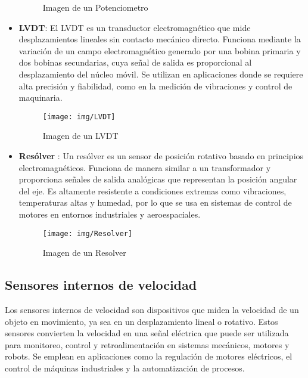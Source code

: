 \begin{itemize}
\begin{figure}[h]
	\caption{Imagen de un Potenciometro}
	\label{fig:Pot}
\end{figure}
\item \textbf{LVDT}: El LVDT es un transductor electromagnético que mide desplazamientos lineales sin contacto mecánico directo. Funciona mediante la variación de un campo electromagnético generado por una bobina primaria y dos bobinas secundarias, cuya señal de salida es proporcional al desplazamiento del núcleo móvil. Se utilizan en aplicaciones donde se requiere alta precisión y fiabilidad, como en la medición de vibraciones y control de maquinaria.
\begin{figure}[h]
	\centering
	\texttt{[image: img/LVDT]}
	\caption{Imagen de un LVDT}
	\label{fig:LVDT}
\end{figure}
\item \textbf{Resólver }: Un resólver es un sensor de posición rotativo basado en principios electromagnéticos. Funciona de manera similar a un transformador y proporciona señales de salida analógicas que representan la posición angular del eje. Es altamente resistente a condiciones extremas como vibraciones, temperaturas altas y humedad, por lo que se usa en sistemas de control de motores en entornos industriales y aeroespaciales.
\begin{figure}[h]
	\centering
	\texttt{[image: img/Resolver]}
	\caption{Imagen de un Resolver}
	\label{fig:Resolver}
\end{figure}
\end{itemize}

\subsection{Sensores internos de velocidad}
Los sensores internos de velocidad son dispositivos que miden la velocidad de un objeto en movimiento, ya sea en un desplazamiento lineal o rotativo. Estos sensores convierten la velocidad en una señal eléctrica que puede ser utilizada para monitoreo, control y retroalimentación en sistemas mecánicos, motores y robots. Se emplean en aplicaciones como la regulación de motores eléctricos, el control de máquinas industriales y la automatización de procesos.


